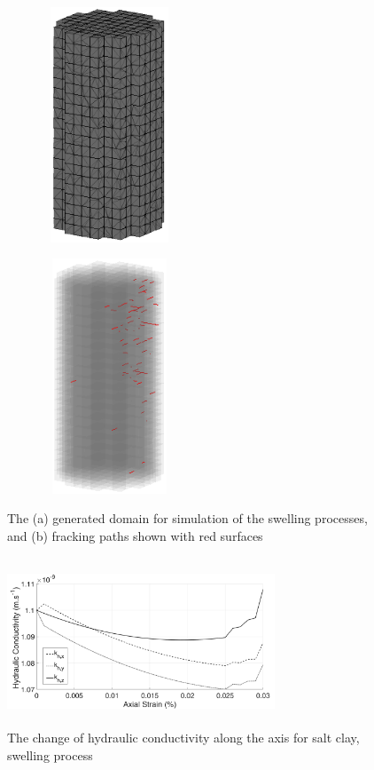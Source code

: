 \begin{figure}[!ht]
\begin{subfigure}[c]{0.5\textwidth}
\centering
\includegraphics[width=4cm,height=7cm]{figures/Amir_ME5_Lattice_Setup.png}
\subcaption{}
\label{fig:Amir_ME5_Lattice_Setup}
\end{subfigure}
\begin{subfigure}[c]{0.5\textwidth}
\centering
\includegraphics[width=4cm,height=7cm]{figures/Amir_ME5_Lattice_Frack.png}
\subcaption{}
\label{fig:Amir_ME5_Lattice_Frack}
\end{subfigure}
\caption{The (a) generated domain for simulation of the swelling processes, and (b) fracking paths shown with red surfaces}
\end{figure}


\begin{figure}[!ht]
\centering
\includegraphics[width=8cm,height=5cm]{figures/Amir_ME5_Lattice_Drying.png}
\caption{The change of hydraulic conductivity along the axis for salt clay, swelling process}
\label{fig:Amir_ME5_Lattice_Drying}
\end{figure} 

